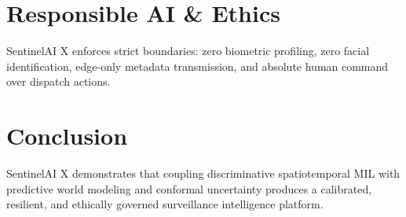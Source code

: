 \documentclass[10pt,journal,compsoc]{IEEEtran}
\begin{document}
\section{Responsible AI \& Ethics}
SentinelAI X enforces strict boundaries: zero biometric profiling, zero facial identification, edge-only metadata transmission, and absolute human command over dispatch actions.

\section{Conclusion}
SentinelAI X demonstrates that coupling discriminative spatiotemporal MIL with predictive world modeling and conformal uncertainty produces a calibrated, resilient, and ethically governed surveillance intelligence platform.



\end{document}
